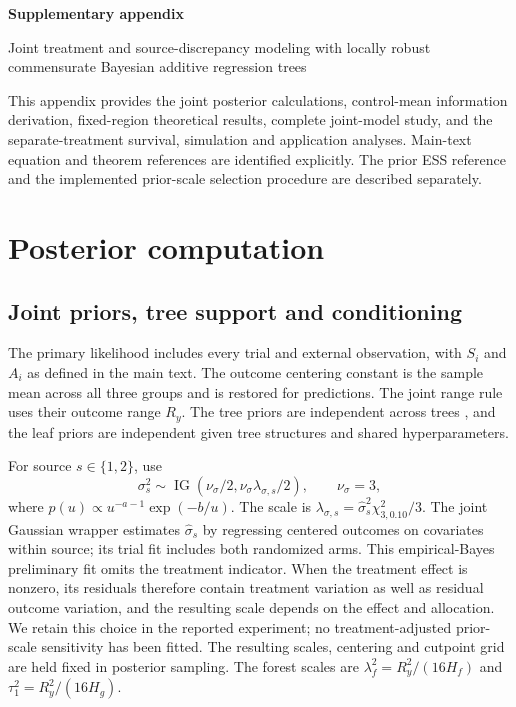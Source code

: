 \documentclass[11pt]{article}
\newcommand{\IG}{\operatorname{IG}}
\theoremstyle{remark}\newtheorem{remark}{Remark}[section]
\providecommand{\DIFaddtex}[1]{{\protect\color{blue} \sf #1}} %
\providecommand{\DIFaddbegin}{} %
\providecommand{\DIFaddend}{} %
\providecommand{\DIFadd}[1]{\texorpdfstring{\DIFaddtex{#1}}{#1}} %
\begin{document}
\begin{center}
{\Large\bfseries Supplementary appendix}\par\medskip
{ \DIFaddbegin \DIFadd{Joint treatment and source-discrepancy modeling with locally }\DIFaddend robust commensurate Bayesian additive regression trees }\par
{}
\end{center}
\noindent This appendix provides the \DIFaddbegin \DIFadd{joint }\DIFaddend posterior calculations,  \DIFaddbegin \DIFadd{control-mean information derivation, fixed-region theoretical results, complete joint-model study, and the separate-treatment survival, simulation and application analyses}\DIFaddend . Main-text equation and theorem references are identified explicitly. The prior ESS reference and the implemented prior-scale selection procedure are described separately.
\tableofcontents
\clearpage
\appendix
{}
\DIFaddbegin {}
\DIFaddend \section{Posterior computation}\label{sec:A}
\subsection{ \DIFaddbegin \DIFadd{Joint priors}\DIFaddend ,  \DIFaddbegin \DIFadd{tree support }\DIFaddend and  \DIFaddbegin \DIFadd{conditioning}\DIFaddend }\label{sec:A.1}
 \DIFaddbegin \DIFadd{The primary likelihood includes every trial and external observation, with $S_i$ and $A_i$ as defined in the main text. The outcome centering constant is the sample mean across all three groups and is }\DIFaddend restored for predictions. The \DIFaddbegin \DIFadd{joint range rule uses their outcome range $R_y$. The }\DIFaddend tree priors are independent across trees \DIFaddbegin \DIFadd{, and the leaf priors are independent given tree structures and shared hyperparameters.
}\DIFaddend 

For  \DIFaddbegin \DIFadd{source }\DIFaddend $s\in\{1,2\}$,  \DIFaddbegin \DIFadd{use
}\[
\sigma_s^2\sim\IG(\nu_\sigma/2,\nu_\sigma\lambda_{\sigma,s}/2),\qquad \nu_\sigma=3,
\]\DIFaddend 
where  $p(u)\propto u^{-a-1}\exp(-b/u)$.  \DIFaddbegin \DIFadd{The scale is $\lambda_{\sigma,s}=\widehat\sigma_s^2\chi^2_{3,0.10}/3$. The joint Gaussian wrapper estimates $\widehat\sigma_s$ by regressing centered outcomes on covariates within source; its trial fit includes both randomized arms. This empirical-Bayes preliminary fit omits the treatment indicator. When the treatment effect is nonzero, its residuals therefore contain treatment variation as well as residual outcome variation, and the resulting scale depends on the effect and allocation. We retain this choice in the reported experiment; no treatment-adjusted prior-scale sensitivity has been fitted. The resulting scales, centering and cutpoint grid are held fixed in posterior sampling. The forest scales are }\DIFaddend $\lambda_f^2=R_y^2/(16H_f)$ and $\tau_1^2=R_y^2/(16H_g)$.
 \DIFaddbegin 
\end{document}
